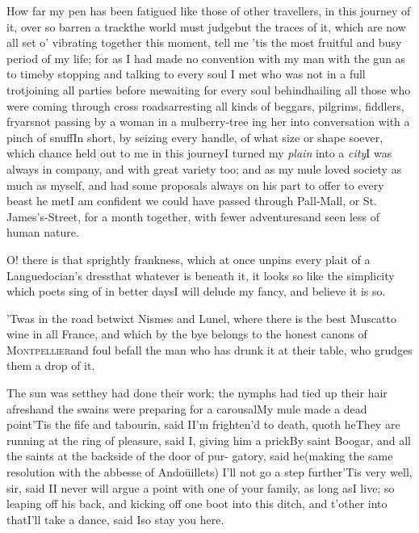 \documentclass{article}
\begin{document}
How far my pen has been fatigued like those of other
travellers, in this journey of it, over so barren a track\tsk the
world must judge\tsk but the traces of it, which are now all set
o’ vibrating together this moment, tell me ’tis the
most fruitful and busy period of my life; for as I had made no
convention with my man with the gun as to time\tsk by stopping
and talking to every soul I met who was not in a full
trot\tsk joining all parties before me\tsk waiting for every
soul behind\tsk hailing all those who were coming through
cross roads\tsk arresting all kinds of beggars, pilgrims,
fiddlers, fryars\tsk not passing by a woman in a
mulberry-tree
ing her into conversation
with a pinch of snuff\tsh In short, by seizing every
handle, of what size or shape soever, which chance held out to me
in this journey\tsk I turned my \textit{plain} into a
\textit{city}\tsk I was always in company, and with great variety too; and
as my mule loved society as much as myself, and had some proposals
always on his part to offer to every beast he met\tsk I am
confident we could have passed through Pall-Mall, or St.\@
James’s-Street, for a month together, with fewer
adventures\tsk and seen less of human nature.

O! there is that sprightly frankness, which at once unpins every
plait of a Languedocian’s dress\tsk that whatever is
beneath it, it looks so like the simplicity which poets sing of in
better days\tsk I will delude my fancy, and believe it is so.

’Twas in the road betwixt Nismes and Lunel,
where there is the best Muscatto wine in all France,
and which by the bye belongs to the honest canons of
\textsc{Montpellier}\tsk and foul befall the man who has
drunk it at their table, who grudges them a drop of it.

\tsh The sun was set\tsk they had done their work;
the nymphs had tied up their hair afresh\tsk and the swains were
preparing for a carousal\tsk My mule made a dead point\tsh ’Tis the fife
and tabourin, said I\tsh I’m frighten’d to
death, quoth he\tsh They are running at the ring of
pleasure, said I, giving him a prick\tsh By saint
Boogar, and all the saints at the backside of the door of
pur- gatory, said he\tsk (making the same resolution with the
abbesse of Andoüillets) I’ll not go a step
further\tsh ’Tis very well, sir, said
I\tsh I never will argue a point with one of your family,
as long as\break I live; so leaping off his back, and kicking off one
boot into this ditch, and t’other into that\tsk I’ll
take a dance, said I\tsk so stay you here.
\end{document}
